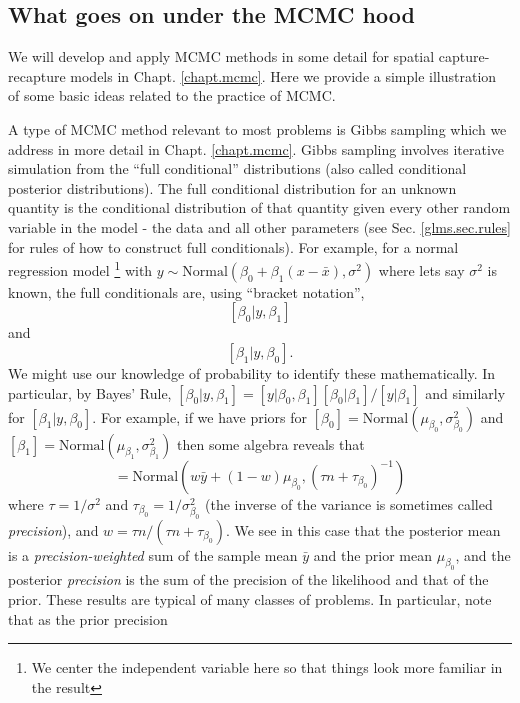 \subsection{What goes on under the MCMC hood}

We will develop and apply MCMC methods in some detail for spatial
capture-recapture models in Chapt. \ref{chapt.mcmc}. Here we provide
a simple illustration of some basic ideas related to the practice of MCMC.

A type of MCMC method relevant to most problems is Gibbs sampling 
\citep{geman_geman:1984} which we address in more detail in Chapt. \ref{chapt.mcmc}.
Gibbs sampling 
involves 
iterative simulation from the ``full
conditional''
distributions (also called conditional posterior
distributions). The full conditional distribution for an unknown
quantity is the conditional distribution of that quantity given every
other random variable in the model - the data and all other
parameters (see Sec. \ref{glms.sec.rules} for rules of how to construct full conditionals).
For example, for a normal regression model
\footnote{We center the 
independent variable here so that things look more familiar in the result} with $y \sim
\mbox{Normal}(\beta_0 + \beta_1 (x-\bar{x}) , \sigma^{2})$
where lets say $\sigma^{2}$ is known, the full conditionals are, using
 ``bracket notation'',
\[
[\beta_0|y,\beta_1]
\]
 and
\[
[\beta_1|y,\beta_0].
\]
We might use our knowledge of probability to identify these
mathematically. In particular, by Bayes' Rule, $[\beta_0|y,\beta_1] =
[y|\beta_0,\beta_1][\beta_0|\beta_1]/[y|\beta_1]$ and similarly for
$[\beta_1|y,\beta_0]$. For example, if we have priors for 
$[\beta_0] = \mbox{Normal}(\mu_{\beta_0}, \sigma^{2}_{\beta_0})$ 
and 
$[\beta_1] = \mbox{Normal}(\mu_{\beta_1}, \sigma^{2}_{\beta_1})$ then
some algebra reveals that 
\begin{equation}
[\beta_0|y,\beta_1] = \mbox{Normal}\left(w \bar{y} + (1-w)\mu_{\beta_0},
(\tau n + \tau_{\beta_0})^{-1} \right)
\label{glms.eq.alpha}
\end{equation}
where $\tau = 1/\sigma^{2}$ and $\tau_{\beta_0} = 1/\sigma^{2}_{\beta_0}$
(the inverse of the variance is sometimes called {\it precision}), and
$w = \tau n/(\tau n + \tau_{\beta_0})$. We see in this case that the
posterior mean is a {\it precision-weighted} sum of the sample mean
$\bar{y}$ and the prior mean $\mu_{\beta_0}$, and the posterior {\it precision} 
is the sum of the precision of the likelihood and that of the
prior. These results are typical of many
classes of problems. In particular, note that as the prior precision
